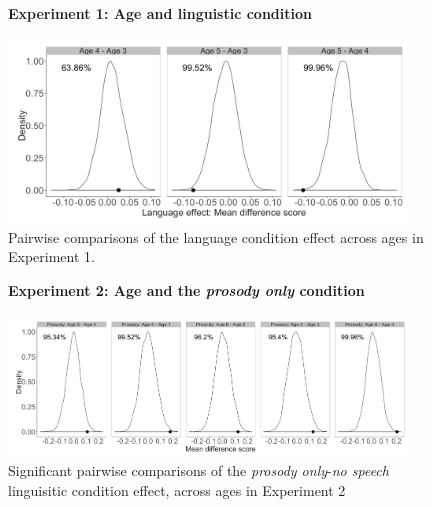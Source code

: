 \documentclass[authoryear, 12pt]{elsarticle}
\begin{document}
\begin{figure}
\begin{center}
\textbf{Experiment 1: Age and linguistic condition}\par\medskip
\includegraphics[width=0.95\textwidth]{figures/E1-child-randvsreal-ttest-agebylg.png}
\end{center}
\caption{Pairwise comparisons of the language condition effect across ages in Experiment 1.} 
\label{fig:E1-lgageinteraction}
\end{figure}

\begin{figure}
\begin{center}
\textbf{Experiment 2: Age and the \textit{prosody only} condition}\par\medskip
\includegraphics[width=0.95\textwidth]{figures/E2-child-randvsreal-ttest-muffledages.png}
\end{center}
\caption{Significant pairwise comparisons of the \textit{prosody only}-\textit{no speech} linguisitic condition effect, across ages in Experiment 2} 
\label{fig:E2-lgageinteraction}
\end{figure}
\end{document}

